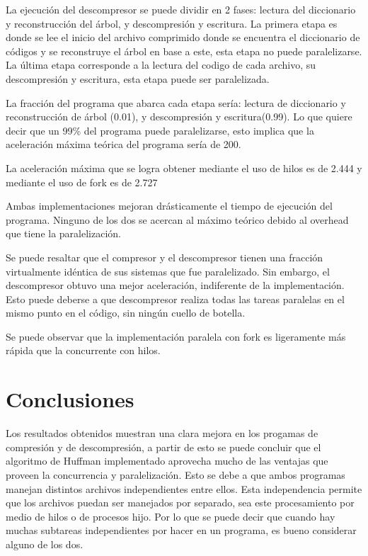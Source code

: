 \documentclass{report}
\begin{document}
La ejecución del descompresor se puede dividir en 2 fases: lectura del diccionario y reconstrucción del árbol, y descompresión y escritura. La primera etapa es donde se lee el inicio del archivo comprimido donde se encuentra el diccionario de códigos y se reconstruye el árbol en base a este, esta etapa no puede paralelizarse. La última etapa corresponde a la lectura del codigo de cada archivo, su descompresión y escritura, esta etapa puede ser paralelizada. 

La fracción del programa que abarca cada etapa sería: lectura de diccionario y reconstrucción de árbol (0.01), y descompresión y escritura(0.99).  Lo que quiere decir que un 99\% del programa puede paralelizarse, esto implica que la aceleración máxima teórica del programa sería de 200.

La aceleración máxima que se logra obtener mediante el uso de hilos es de 2.444 y mediante el uso de fork es de 2.727 

Ambas implementaciones mejoran drásticamente el tiempo de ejecución del programa. Ninguno de los dos se acercan al máximo teórico debido al overhead que tiene la paralelización.

 Se puede resaltar que el compresor y el descompresor tienen una fracción virtualmente idéntica de sus sistemas que fue paralelizado. Sin embargo, el descompresor obtuvo una mejor aceleración, indiferente de la implementación. Esto puede deberse a que descompresor realiza todas las tareas paralelas en el mismo punto en el código, sin ningún cuello de botella.

Se puede observar que la implementación paralela con fork es ligeramente más rápida que la  concurrente con hilos.

\section{Conclusiones}

Los resultados obtenidos muestran una clara mejora en los progamas de compresión y de descompresión, a partir de esto se puede concluir que el algoritmo de Huffman implementado aprovecha mucho de las ventajas que proveen la concurrencia y paralelización. 
Esto se debe a que ambos programas manejan distintos archivos independientes entre ellos.
Esta independencia permite que los archivos puedan ser manejados por separado, sea este procesamiento por medio de hilos o de procesos hijo.
Por lo que se puede decir que cuando hay muchas subtareas independientes por hacer en un programa, es bueno considerar alguno de los dos. 
\end{document}
